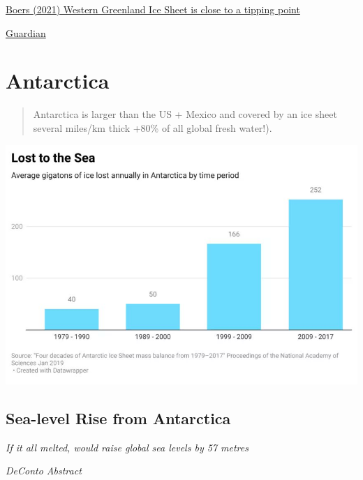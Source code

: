 \documentclass[
]{book}
\begin{document}
\href{https://www.pnas.org/content/118/21/e2024192118}{Boers (2021) Western Greenland Ice Sheet is close to a tipping point}

\href{https://www.theguardian.com/environment/2021/may/17/greenland-ice-sheet-on-brink-of-major-tipping-point-says-study}{Guardian}

\hypertarget{antarctica}{%
\section{Antarctica}\label{antarctica}}

\begin{quote}
Antarctica is larger than the US + Mexico and covered by an ice sheet several miles/km thick +80\% of all global fresh water!).
\end{quote}

\includegraphics{fig/Antarctica_Ice_Loss_to_Sea.jpeg}

\hypertarget{sea-level-rise-from-antarctica}{%
\subsection{Sea-level Rise from Antarctica}\label{sea-level-rise-from-antarctica}}

\emph{If it all melted, would raise global sea levels by 57 metres}

\emph{DeConto Abstract}
\end{document}
